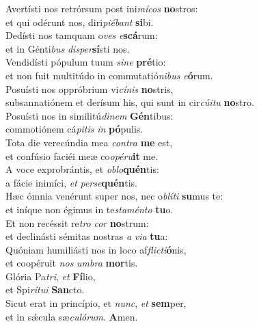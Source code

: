 \evenverse Avertísti nos retrórsum post ini\textit{mí}\textit{cos} \textbf{no}stros:~\*\\
\evenverse et qui odérunt nos, diri\textit{pi}\textit{é}\textit{bant} \textbf{si}bi.\\
\oddverse Dedísti nos tamquam o\textit{ves} \textit{e}\textbf{scá}rum:~\*\\
\oddverse et in Génti\textit{bus} \textit{di}\textit{sper}\textbf{sí}sti nos.\\
\evenverse Vendidísti pópulum tuum \textit{si}\textit{ne} \textbf{pré}tio:~\*\\
\evenverse et non fuit multitúdo in commutatió\textit{ni}\textit{bus} \textit{e}\textbf{ó}rum.\\
\oddverse Posuísti nos oppróbrium vi\textit{cí}\textit{nis} \textbf{no}stris,~\*\\
\oddverse subsannatiónem et derísum his, qui sunt in cir\textit{cú}\textit{i}\textit{tu} \textbf{no}stro.\\
\evenverse Posuísti nos in similitú\textit{di}\textit{nem} \textbf{Gén}tibus:~\*\\
\evenverse commotiónem cá\textit{pi}\textit{tis} \textit{in} \textbf{pó}pulis.\\
\oddverse Tota die verecúndia mea \textit{con}\textit{tra} \textbf{me} est,~\*\\
\oddverse et confúsio faciéi meæ co\textit{o}\textit{pé}\textit{ru}\textbf{it} me.\\
\evenverse A voce exprobrántis, et \textit{o}\textit{blo}\textbf{quén}tis:~\*\\
\evenverse a fácie inimíci, \textit{et} \textit{per}\textit{se}\textbf{quén}tis.\\
\oddverse Hæc ómnia venérunt super nos, nec o\textit{blí}\textit{ti} \textbf{su}mus te:~\*\\
\oddverse et iníque non égimus in te\textit{sta}\textit{mén}\textit{to} \textbf{tu}o.\\
\evenverse Et non recéssit re\textit{tro} \textit{cor} \textbf{no}strum:~\*\\
\evenverse et declinásti sémitas nostras \textit{a} \textit{vi}\textit{a} \textbf{tu}a:\\
\oddverse Quóniam humiliásti nos in loco af\textit{fli}\textit{cti}\textbf{ó}nis,~\*\\
\oddverse et coopéruit \textit{nos} \textit{um}\textit{bra} \textbf{mor}tis.\\
\evenverse Glória Pa\textit{tri}, \textit{et} \textbf{Fí}lio,~\*\\
\evenverse et Spi\textit{rí}\textit{tu}\textit{i} \textbf{San}cto.\\
\oddverse Sicut erat in princípio, et \textit{nunc}, \textit{et} \textbf{sem}per,~\*\\
\oddverse et in sǽcula sæ\textit{cu}\textit{ló}\textit{rum}. \textbf{A}men.\\
